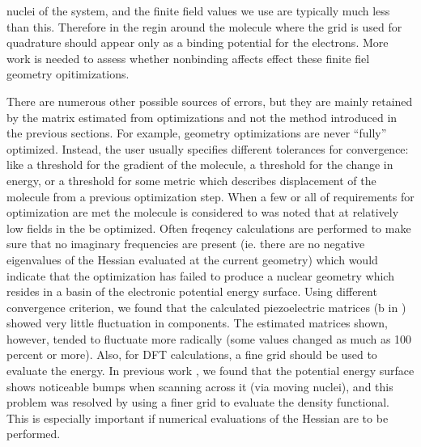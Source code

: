 nuclei of the system, and the finite field values we use are typically much less than this.  
Therefore in the regin around the molecule where the grid is used for quadrature should appear only as a binding potential for the electrons.  
More work is needed to assess whether nonbinding affects effect these finite fiel geometry opitimizations.

There are numerous other possible sources of errors, but they are mainly retained by the matrix estimated from optimizations and not the method introduced in the previous sections. 
For example,
geometry optimizations are never ``fully'' optimized. 
Instead, the user usually specifies different tolerances for convergence: like a threshold for the gradient of the molecule, a threshold for the change in energy, or
a threshold for some metric which describes displacement of the molecule from a previous optimization step. 
When a few or all of requirements for optimization are met the molecule is considered to was noted that at relatively low fields in the 
be optimized.  
Often freqency calculations are performed to make sure that no imaginary frequencies are present (ie. there are no negative eigenvalues of the Hessian evaluated at the 
current geometry) which would indicate that the optimization has failed to produce a nuclear geometry which resides in a basin of the electronic potential energy surface.  
Using different 
convergence criterion, we found that the calculated piezoelectric matrices (b in ) showed very little fluctuation in components.  
The estimated matrices shown, however, tended to fluctuate
more radically (some values changed as much as 100 percent or more).  
Also, for DFT calculations, a fine grid should be used to evaluate the energy.  
In previous work \cite{Werling0}, we found that the potential
energy surface shows noticeable bumps when scanning across it (via moving nuclei), and this problem was resolved by using a finer grid to evaluate the density functional.  
This is especially
important if numerical evaluations of the Hessian are to be performed.  

